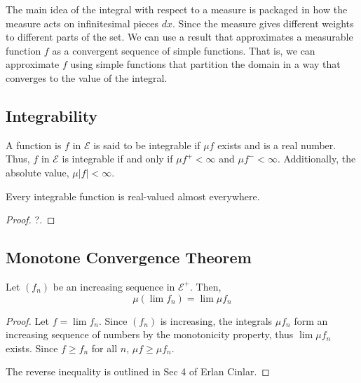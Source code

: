 The main idea of the integral with respect to a measure is packaged in how the measure acts on infinitesimal pieces $dx$. Since the measure gives different weights to different parts of the set. We can use a result that approximates a measurable function $f$ as a convergent sequence of simple functions. That is, we can approximate $f$ using simple functions that partition the domain in a way that converges to the value of the integral. 

\subsection{Integrability}

A function is $f$ in $\mathcal{E}$ is said to be integrable if $\mu f$ exists and is a real number. Thus, $f$ in $\mathcal{E}$ is integrable if and only if $\mu f^+ < \infty$ and $\mu f^- < \infty$. Additionally, the absolute value, $\mu |f| < \infty$. 

\begin{definition}
	Every integrable function is real-valued almost everywhere. 
	\begin{proof}
		?.
	\end{proof}
\end{definition}
\subsection{Monotone Convergence Theorem}

\begin{definition}
	Let $(f_n)$ be an increasing sequence in $\mathcal{E}^+$. Then,
	\begin{equation}
		\mu(\lim f_n) = \lim \mu f_n
	\end{equation}
	\begin{proof}
		Let $f = \lim f_n$. Since $(f_n)$ is increasing, the integrals $\mu f_n$ form an increasing sequence of numbers by the monotonicity property, thus $\lim \mu f_n$ exists. Since $f \geq f_n$ for all $n$, $\mu f \geq \mu f_n$.

		The reverse inequality is outlined in Sec 4 of Erlan Cinlar. 
	\end{proof}
\end{definition}

